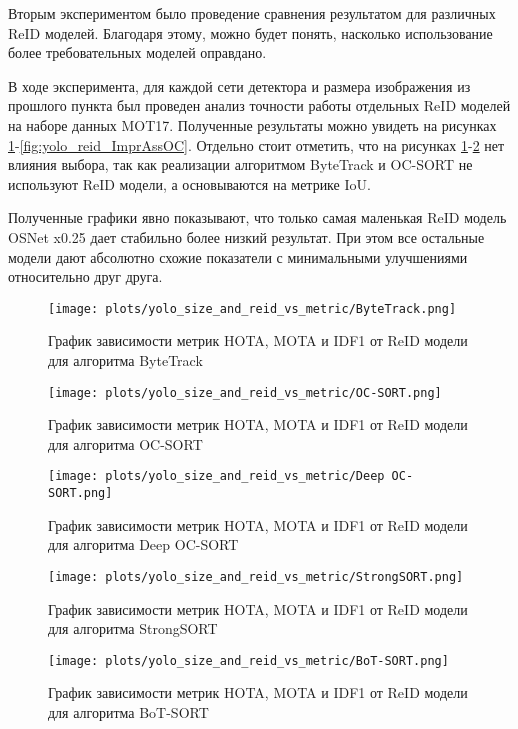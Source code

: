 Вторым экспериментом было проведение сравнения результатом для различных ReID моделей. Благодаря этому, можно будет понять, насколько использование более требовательных моделей оправдано. 

В ходе эксперимента, для каждой сети детектора и размера изображения из прошлого пункта был проведен анализ точности работы отдельных ReID моделей на наборе данных MOT17. Полученные результаты можно увидеть на рисунках \ref{fig:yolo_reid_ByteTrack}-\ref{fig:yolo_reid_ImprAssOC}. Отдельно стоит отметить, что на рисунках \ref{fig:yolo_reid_ByteTrack}-\ref{fig:yolo_reid_OC-SORT} нет влияния выбора, так как реализации алгоритмом ByteTrack и OC-SORT не используют ReID модели, а основываются на метрике IoU.

Полученные графики явно показывают, что только самая маленькая ReID модель OSNet x0.25 дает стабильно более низкий результат. При этом все остальные модели дают абсолютно схожие показатели с минимальными улучшениями относительно друг друга.
\begin{figure}[ht]
    \centering
    \texttt{[image: plots/yolo\_size\_and\_reid\_vs\_metric/ByteTrack.png]}
    \caption{График зависимости метрик HOTA, MOTA и IDF1 от ReID модели для алгоритма ByteTrack}
    \label{fig:yolo_reid_ByteTrack}
\end{figure}

\begin{figure}[ht]
    \centering
    \texttt{[image: plots/yolo\_size\_and\_reid\_vs\_metric/OC-SORT.png]}
    \caption{График зависимости метрик HOTA, MOTA и IDF1 от ReID модели для алгоритма OC-SORT}
    \label{fig:yolo_reid_OC-SORT}
\end{figure}

\begin{figure}[ht]
    \centering
    \texttt{[image: plots/yolo\_size\_and\_reid\_vs\_metric/Deep OC-SORT.png]}
    \caption{График зависимости метрик HOTA, MOTA и IDF1 от ReID модели для алгоритма Deep OC-SORT}
    \label{fig:yolo_reid_Deep OC-SORT}
\end{figure}

\begin{figure}[ht]
    \centering
    \texttt{[image: plots/yolo\_size\_and\_reid\_vs\_metric/StrongSORT.png]}
    \caption{График зависимости метрик HOTA, MOTA и IDF1 от ReID модели для алгоритма StrongSORT}
    \label{fig:yolo_reid_StrongSORT}
\end{figure}

\begin{figure}[ht]
    \centering
    \texttt{[image: plots/yolo\_size\_and\_reid\_vs\_metric/BoT-SORT.png]}
    \caption{График зависимости метрик HOTA, MOTA и IDF1 от ReID модели для алгоритма BoT-SORT}
    \label{fig:yolo_reid_BoT-SORT}
\end{figure}

